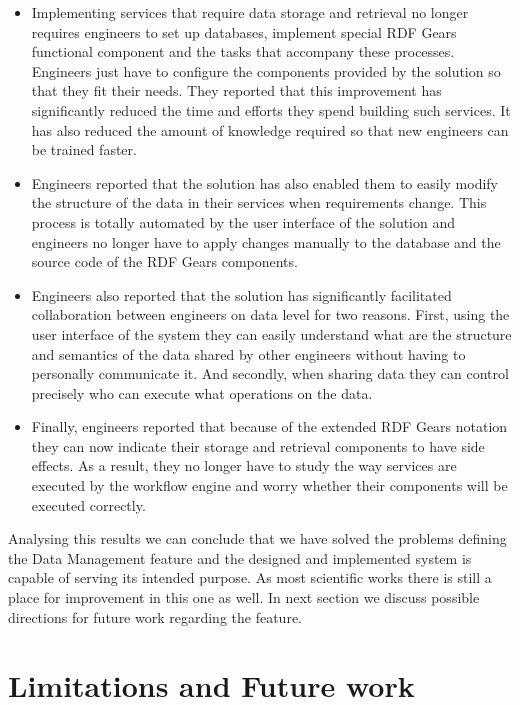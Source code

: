 \begin{itemize}

\item Implementing services that require data storage and retrieval no longer requires engineers to set up databases, implement special RDF Gears functional component and the tasks that accompany these processes. Engineers just have to configure the components provided by the solution so that they fit their needs. They reported that this improvement has significantly reduced the time and efforts they spend building such services. It has also reduced the amount of knowledge required so that new engineers can be trained faster.

\item Engineers reported that the solution has also enabled them to easily modify the structure of the data in their services when requirements change. This process is totally automated by the user interface of the solution and engineers no longer have to apply changes manually to the database and the source code of the RDF Gears components.

\item Engineers also reported that the solution has significantly facilitated collaboration between engineers on data level for two reasons. First, using the user interface of the system they can easily understand what are the structure and semantics of the data shared by other engineers without having to personally communicate it. And secondly, when sharing data they can control precisely who can execute what operations on the data. 

\item Finally, engineers reported that because of the extended RDF Gears notation they can now indicate their storage and retrieval components to have side effects. As a result, they no longer have to study the way services are executed by the workflow engine and worry whether their components will be executed correctly. 
	
\end{itemize}

Analysing this results we can conclude that we have solved the problems defining the Data Management feature and the designed and implemented system is capable of serving its intended purpose. As most scientific works there is still a place for improvement in this one as well. In next section we discuss possible directions for future work regarding the feature.

\section{Limitations and Future work}
\label{sec:limitsStorage}

